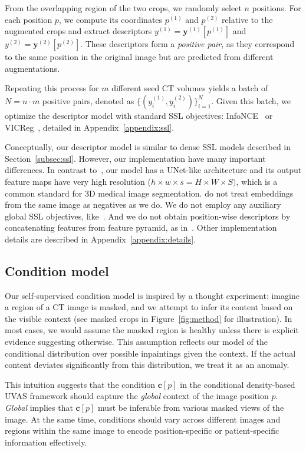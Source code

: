 From the overlapping region of the two crops, we randomly select \(n\) positions. For each position \(p\), we compute its coordinates \(p^{(1)}\) and \(p^{(2)}\) relative to the augmented crops and extract descriptors \(y^{(1)} = \mathbf{y}^{(1)}[p^{(1)}]\) and \(y^{(2)} = \mathbf{y}^{(2)}[p^{(2)}]\). These descriptors form a \emph{positive pair}, as they correspond to the same position in the original image but are predicted from different augmentations.

Repeating this process for \(m\) different seed CT volumes yields a batch of ${N = n \cdot m}$ positive pairs, denoted as \(\{(y^{(1)}_i, y^{(2)}_i)\}_{i=1}^N\). Given this batch, we optimize the descriptor model with standard SSL objectives: InfoNCE~\cite{simclr} or VICReg~\cite{vicreg}, detailed in Appendix~\ref{appendix:ssl}.

Conceptually, our descriptor model is similar to dense SSL models described in Section~\ref{subsec:ssl}. However, our implementation have many important differences. In contrast to~\cite{dense_cl,vader,vicregl}, our model has a UNet-like architecture and its output feature maps have very high resolution ($h \times w \times s = H \times W \times S)$, which is a common standard for 3D medical image segmentation. \cite{dense_cl,vader} do not treat embeddings from the same image as negatives as we do. We do not employ any auxiliary global SSL objectives, like~\cite{dense_cl,vicregl}. And we do not obtain position-wise descriptors by concatenating features from feature pyramid, as in~\cite{vox2vec}. Other implementation details are described in Appendix~\ref{appendix:details}.

\subsection{Condition model}
\label{subsec:condition_model}

Our self-supervised condition model is inspired by a thought experiment: imagine a region of a CT image is masked, and we attempt to infer its content based on the visible context (see masked crops in Figure~\ref{fig:method} for illustration). In most cases, we would assume the masked region is healthy unless there is explicit evidence suggesting otherwise. This assumption reflects our model of the conditional distribution over possible inpaintings given the context. If the actual content deviates significantly from this distribution, we treat it as an anomaly.

This intuition suggests that the condition \(\mathbf{c}[p]\) in the conditional density-based UVAS framework should capture the \emph{global} context of the image position \(p\). \emph{Global} implies that \(\mathbf{c}[p]\) must be inferable from various masked views of the image. At the same time, conditions should vary across different images and regions within the same image to encode position-specific or patient-specific information effectively.

